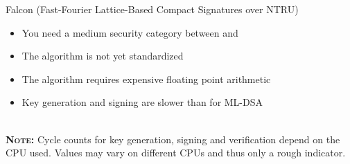 \documentclass[11pt,english,a4paper, landscape]{scrartcl}
\begin{document}
\begin{algorithmbox}{Falcon (Fast-Fourier Lattice-Based Compact Signatures over NTRU)}
\begin{minipage}[t]{0.49\textwidth}
\begin{itemize}[leftmargin=*]
			\setlength\itemsep{0em}
			\item You need a medium security category between  \hspace{-4mm} and 
			\item The algorithm is not yet standardized
			\item The algorithm requires expensive floating point arithmetic
			\item Key generation and signing are slower than for ML-DSA
			\end{itemize}

		\end{minipage}\\[\baselineskip]

		{\tiny  {\bfseries \scshape Note:} Cycle counts for key generation, signing and verification depend on the CPU used. Values may vary on different CPUs and thus only a rough indicator.}
		\vspace{0cm}
	\end{algorithmbox}
\end{document}
